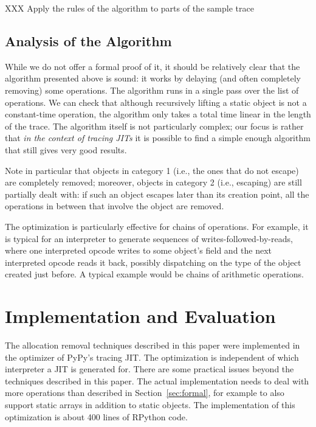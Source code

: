 \documentclass[preprint]{sigplanconf}
\newcommand\ie{i.e.,\xspace}
\begin{document}
XXX Apply the rules of the algorithm to parts of the sample trace


\subsection{Analysis of the Algorithm}
\label{sub:analysis}

While we do not offer a formal proof of it, it should be relatively clear
that the algorithm presented above is sound: it works by delaying (and
often completely removing) some operations.  The algorithm runs in a
single pass over the list of operations.  We can check that although
recursively lifting a static object is not a constant-time operation,
the algorithm only takes a total time linear in the length of the trace.
The algorithm itself is not particularly complex; our focus is
rather that \emph{in the context of tracing JITs} it is possible to find a
simple enough algorithm that still gives very good results.

Note in particular that objects in category 1 (\ie the ones that do
not escape) are completely removed; moreover, objects in category 2
(\ie escaping) are still partially dealt with: if such an object
escapes later than its creation point, all the operations in between that
involve the object are removed.

The optimization is particularly effective for chains of operations.
For example, it is typical for an interpreter to generate sequences of
writes-followed-by-reads, where one interpreted opcode writes to some
object's field and the next interpreted opcode reads it back, possibly
dispatching on the type of the object created just before.  A typical example
would be chains of arithmetic operations.





\section{Implementation and Evaluation}
\label{sec:Evaluation}

The allocation removal techniques described in this paper were implemented in
the optimizer of PyPy's tracing JIT. The optimization is independent of which
interpreter a JIT is generated for. There are some practical issues beyond the
techniques described in this paper. The actual implementation needs to deal with
more operations than described in Section~\ref{sec:formal}, for example to
also support static arrays in addition to static objects. The implementation of
this optimization is about 400 lines of RPython code.
\end{document}

